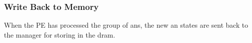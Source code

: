\documentclass[journal]{IEEEtran}
\begin{document}

\subsubsection{Write Back to Memory}
\label{ssec:writingANStates}

When the PE has processed the group of \acp{an}, the new \ac{an} states are sent back to the manager for storing in the \ac{dram}. 

\end{document}
